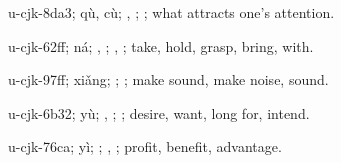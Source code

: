 \begin{multicols}{2}
{\cjkgGlue{}u-cjk-8da3; qù, cù; \cjkgGlue{}, \cjkgGlue{}\cjkgGlue{}\cjkgGlue{}; \cjkgGlue{}; what attracts one's attention.

\cjkgGlue{}u-cjk-62ff; ná; \cjkgGlue{}\cjkgGlue{}\cjkgGlue{}, \cjkgGlue{}\cjkgGlue{}\cjkgGlue{}; \cjkgGlue{}, \cjkgGlue{}; take, hold, grasp, bring, with.

\cjkgGlue{}u-cjk-97ff; xiǎng; \cjkgGlue{}\cjkgGlue{}\cjkgGlue{}; \cjkgGlue{}; make sound, make noise, sound.

\cjkgGlue{}u-cjk-6b32; yù; \cjkgGlue{}\cjkgGlue{}\cjkgGlue{}, \cjkgGlue{}\cjkgGlue{}\cjkgGlue{}; \cjkgGlue{}; desire, want, long for, intend.

\cjkgGlue{}u-cjk-76ca; yì; \cjkgGlue{}\cjkgGlue{}\cjkgGlue{}; \cjkgGlue{}, \cjkgGlue{}; profit, benefit, advantage.

}
\end{multicols}
